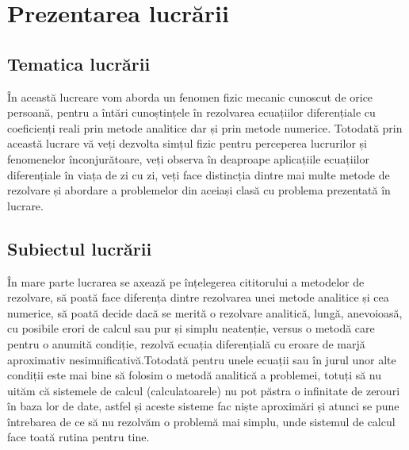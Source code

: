 \documentclass[12pt, a4paper]{article}
\title{\centering{Oscilații armonice\\ cu forța de rezistență a aerului}}
\author{Negru Mihai}
\date{Martie 2022}
\begin{document}
\maketitle
\newpage
\tableofcontents{}
\newpage
\section{Prezentarea lucrării}
\subsection{Tematica lucrării}
\hspace{0.4cm}În această lucreare vom aborda un fenomen fizic mecanic cunoscut de orice persoană, pentru a 
întări cunoștințele în rezolvarea ecuațiilor diferențiale cu coeficienți reali prin metode analitice dar și prin metode numerice. Totodată prin această lucrare vă veți dezvolta simțul fizic pentru perceperea lucrurilor și fenomenelor înconjurătoare, veți observa în deaproape aplicațiile ecuațiilor diferențiale în viața de zi cu zi, veți face distincția dintre mai multe metode de rezolvare și abordare a problemelor din aceiași clasă cu problema prezentată în lucrare.
\subsection{Subiectul lucrării}
\hspace{0.4cm}În mare parte lucrarea se axează pe înțelegerea cititorului a metodelor de rezolvare, să poată face diferența dintre rezolvarea unei metode analitice și cea numerice, să poată decide dacă se merită o rezolvare analitică, lungă, anevoioasă, cu posibile erori de calcul sau pur și simplu neatenție, versus o metodă care pentru o anumită condiție, rezolvă ecuația diferențială cu eroare de marjă aproximativ nesimnificativă.Totodată pentru unele ecuații sau în jurul unor alte condiții este mai bine să folosim o metodă analitică a problemei, totuți să nu uităm că sistemele de calcul (calculatoarele) nu pot păstra o infinitate de zerouri în baza lor de date, astfel și aceste sisteme fac niște aproximări și atunci se pune întrebarea de ce să nu rezolvăm o problemă mai simplu, unde sistemul de calcul face toată rutina pentru tine.  
\end{document}
